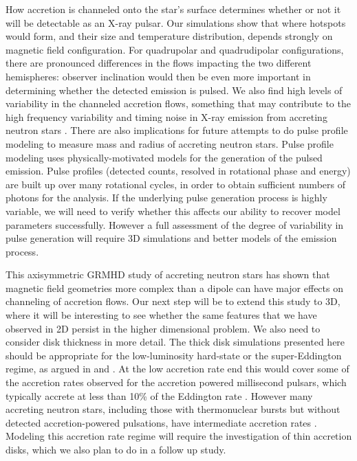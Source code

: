 \documentclass[fleqn,usenatbib]{mnras}
\begin{document}
How accretion is channeled onto the star's surface determines whether or not it will be detectable as an X-ray pulsar. Our simulations show that where hotspots would form, and their size and temperature distribution, depends strongly on magnetic field configuration.  For quadrupolar and quadrudipolar configurations, there are pronounced differences in the flows impacting the two different hemispheres: observer inclination would then be even more important in determining whether the detected emission is pulsed.  We also find high levels of variability in the channeled accretion flows, something that may contribute to the high frequency variability and timing noise in X-ray emission from accreting neutron stars \citep[see for example][]{Hartman2008,Bachetti2010,PatrunoandWatts2012,Mendez2021}. There are also implications for future attempts to do pulse profile modeling to measure mass and radius of accreting neutron stars. Pulse profile modeling uses physically-motivated models for the generation of the pulsed emission. Pulse profiles (detected counts, resolved in rotational phase and energy) are built up over many rotational cycles, in order to obtain sufficient numbers of photons for the analysis.  If the underlying pulse generation process is highly variable, we will need to verify whether this affects our ability to recover model parameters successfully.  However a full assessment of the degree of variability in pulse generation will require 3D simulations and better models of the emission process. 

This axisymmetric GRMHD study of accreting neutron stars has shown that magnetic field geometries more complex than a dipole can have major effects on channeling of accretion flows. Our next step will be to extend this study to 3D, where it will be interesting to see whether the same features that we have observed in 2D persist in the higher dimensional problem.  We also need to consider disk thickness in more detail.  The thick disk simulations presented here should be appropriate for the low-luminosity hard-state or the super-Eddington regime, as argued in  and \cite{ParfreySpitkovskyEtAl2017}. At the low accretion rate end this would cover some of the accretion rates observed for the accretion powered millisecond pulsars, which typically accrete at less than 10\% of the Eddington rate \citep{PatrunoandWatts2012}.  However many accreting neutron stars, including those with thermonuclear bursts but without detected accretion-powered pulsations, have intermediate accretion rates \citep{Galloway2020}.  Modeling this accretion rate regime will require the investigation of thin accretion disks, which we also plan to do in a follow up study. 
\end{document}
